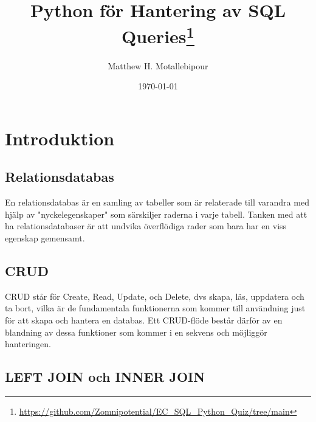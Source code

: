 \documentclass[10pt]{article}
\begin{document}

\title{Python för Hantering av SQL Queries\footnote{\href{https://github.com/Zomnipotential/EC\_SQL\_Python\_Quiz/tree/main}{https://github.com/Zomnipotential/EC\_SQL\_Python\_Quiz/tree/main}}}
\author{Matthew H. Motallebipour}
\date{\today}
\maketitle

\section{Introduktion}

\subsection{Relationsdatabas}

En relationsdatabas är en samling av tabeller som är relaterade till varandra med hjälp av "nyckelegenskaper" som särskiljer raderna i varje tabell. Tanken med att ha relationsdatabaser är att undvika överflödiga rader som bara har en viss egenskap gemensamt.

\subsection{CRUD}

CRUD står för Create, Read, Update, och Delete, dvs skapa, läs, uppdatera och ta bort, vilka är de fundamentala funktionerna som kommer till användning just för att skapa och hantera en databas. Ett CRUD-flöde består därför av en blandning av dessa funktioner som kommer i en sekvens och möjliggör hanteringen.

\subsection{LEFT JOIN och INNER JOIN}
\end{document}
